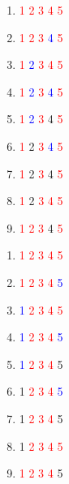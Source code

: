 \documentclass[12pt, a4paper]{article}
\begin{document}
\hline

\begin{multicols}{3}
\begin{enumerate}
    \item \textcolor{red}{1 2 3 4 5}
    \item \textcolor{red}{1 2 3 }\textcolor{blue}{4 }\textcolor{red}{5} 
    \item \textcolor{red}{1 }\textcolor{blue}{2 }\textcolor{red}{3 4 5} 
    \item \textcolor{red}{1 }\textcolor{blue}{2 }\textcolor{red}{3 }\textcolor{blue}{4 }\textcolor{red}{5} 
    \item \textcolor{red}{1 }\textcolor{blue}{2 }\textcolor{red}{3 }4 \textcolor{red}{5} 
    \item \textcolor{red}{1 }2 \textcolor{red}{3 }\textcolor{blue}{4 }\textcolor{red}{5} 
    \item \textcolor{red}{1 }2 \textcolor{red}{3 }4 \textcolor{red}{5} 
    \item \textcolor{red}{1 }2 \textcolor{red}{3 4 5} 
    \item \textcolor{red}{1 2 3 }4 \textcolor{red}{5}
\end{enumerate}
\end{multicols}

\hline

\begin{multicols}{3}
\begin{enumerate}
    \item \textcolor{red}{1 2 3 4 5}
    \item \textcolor{red}{1 2 3 4 }\textcolor{blue}{5}
    \item \textcolor{blue}{1 }\textcolor{red}{2 3 4 5} 
    \item \textcolor{blue}{1 }\textcolor{red}{2 3 4 }\textcolor{blue}{5} 
    \item \textcolor{blue}{1 }\textcolor{red}{2 3 4 }5 
    \item 1 \textcolor{red}{2 3 4 }\textcolor{blue}{5} 
    \item 1 \textcolor{red}{2 3 4 }5 
    \item 1 \textcolor{red}{2 3 4 5} 
    \item \textcolor{red}{1 2 3 4 }5
\end{enumerate}
\end{multicols}

\hline
\end{document}
